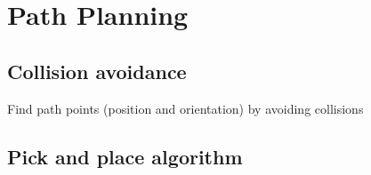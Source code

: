 \section{Path Planning}

\subsection{Collision avoidance} 
Find path points (position and orientation) by avoiding collisions
\subsection{Pick and place algorithm}

